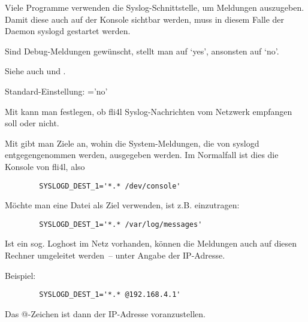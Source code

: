   Viele Programme verwenden die Syslog-Schnittstelle, um
  Meldungen auszugeben. Damit diese auch auf der Konsole
  sichtbar werden, muss in diesem Falle der Daemon syslogd gestartet
  werden.

  Sind Debug-Meldungen gewünscht, stellt man  auf `yes',
  ansonsten auf `no'.

  Siehe auch  und
  .


  Standard-Einstellung: ='no'

  \begin{description}

  Mit  kann man festlegen, ob fli4l Syslog-Nachrichten
  vom Netzwerk empfangen soll oder nicht.


  Mit  gibt man Ziele an, wohin die System-Meldungen, die
  von syslogd entgegengenommen werden, ausgegeben werden. Im
  Normalfall ist dies die Konsole von fli4l, also

\begin{example}
\begin{verbatim}
        SYSLOGD_DEST_1='*.* /dev/console'
\end{verbatim}
\end{example}

  Möchte man eine Datei als Ziel verwenden, ist z.B. einzutragen:

\begin{example}
\begin{verbatim}
        SYSLOGD_DEST_1='*.* /var/log/messages'
\end{verbatim}
\end{example}

  Ist ein sog. Loghost im Netz vorhanden, können die Meldungen auch
  auf diesen Rechner umgeleitet werden~-- unter Angabe der IP-Adresse.

  Beispiel:
\begin{example}
\begin{verbatim}
        SYSLOGD_DEST_1='*.* @192.168.4.1'
\end{verbatim}
\end{example}

  Das @-Zeichen ist dann der IP-Adresse voranzustellen.


\end{description}
